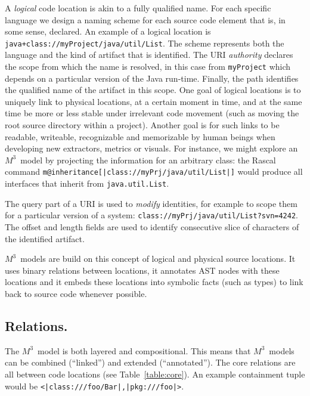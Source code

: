 \documentclass[conference]{IEEEtran}
\newcommand{\loc}[1]{\small{\texttt{#1}}\xspace}
\newcommand{\mthree}{\ensuremath{M^3}\xspace}
\begin{document}
A \emph{logical} code location is akin to a fully qualified name. For each
specific language we design a naming scheme for each source code element that
is, in some sense, declared. An example of a logical location is
\loc{java+class://myProject/java/util/List}. The scheme represents both the
language and the kind of artifact that is identified. The URI
\textit{authority} declares the scope from which the name is resolved, in this
case from \texttt{myProject} which depends on a particular version of the Java
run-time. Finally, the path identifies the qualified name of the artifact in
this scope. One goal of logical locations is to uniquely link to physical
locations, at a certain moment in time, and at the same time be more or less
stable under irrelevant code movement (such as moving the root source
directory within a project). Another goal is for such links to be readable,
writeable, recognizable and memorizable by human beings when developing new
extractors, metrics or visuals. For instance, we might explore an \mthree\
model by projecting the information for an arbitrary class: the Rascal command
\texttt{m@inheritance[|class://myPrj/java/util/List|]} would produce all
interfaces that inherit from \verb|java.util.List|.

The query part of a URI is used to \emph{modify} identities, for example to
scope them for a particular version of a system:
\loc{class://myPrj/java/util/List?svn=4242}. The offset and length fields are
used to identify consecutive slice of characters of the identified artifact.

\mthree\ models are build on this concept of logical and physical source
locations. It uses binary relations between locations, it annotates AST nodes
with these locations and it embeds these locations into symbolic facts (such
as types) to link back to source code whenever possible.

\subsection{Relations.} The \mthree\  model is both layered and compositional.
This means that \mthree\ models can be combined (``linked'') and extended
(``annotated''). The core relations are all between code locations (see
Table~\ref{table:core}). An example containment tuple would be
\loc{<|class:///foo/Bar|,|pkg:///foo|>}.
\end{document}
